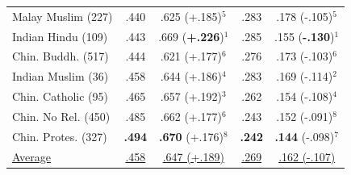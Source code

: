 \begin{tabular}{@{} p{2.6cm} | c c | c c @{}}
Malay Muslim (227) & .440 & .625 (+.185)$^{5}$ & .283 & .178 (-.105)$^{5}$ \\
Indian Hindu (109) & .443 & .669 (\textbf{+.226})$^{1}$ & .285 & .155 (\textbf{-.130})$^{1}$ \\
Chin. Buddh. (517) & .444 & .621 (+.177)$^{6}$ & .276 & .173 (-.103)$^{6}$ \\
Indian Muslim (36) & .458 & .644 (+.186)$^{4}$ & .283 & .169 (-.114)$^{2}$ \\
Chin. Catholic (95) & .465 & .657 (+.192)$^{3}$ & .262 & .154 (-.108)$^{4}$ \\
Chin. No Rel. (450) & .485 & .662 (+.177)$^{6}$ & .243 & .152 (-.091)$^{8}$ \\
Chin. Protes. (327) & \textbf{.494} & \textbf{.670} (+.176)$^{8}$ & \textbf{.242} & \textbf{.144} (-.098)$^{7}$ \\
\midrule
\underline{Average} & \underline{.458} & \underline{.647 (+.189)} & \underline{.269} & \underline{.162 (-.107)} \\
\bottomrule
\end{tabular}
